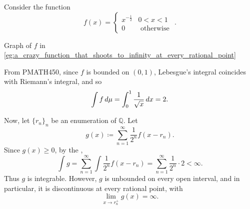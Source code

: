 \documentclass[notoc,notitlepage]{tufte-book}
\begin{document}
\begin{eg}\label{eg:a_crazy_function_that_shoots_to_infinity_at_every_rational_point}
  Consider the function
  \begin{equation*}
    f(x) = \begin{cases}
      x^{- \frac{1}{2}} & 0 < x < 1 \\
      0 & \text{ otherwise }
    \end{cases}.
  \end{equation*}
  \begin{marginfigure}
    \centering
    \caption{Graph of $f$ in \cref{eg:a_crazy_function_that_shoots_to_infinity_at_every_rational_point}}\label{fig:graph_of_eg_a_crazy_function_that_shoots_to_infinity_at_every_rational_point}
  \end{marginfigure}
  From PMATH450, since $f$ is bounded on $(0, 1)$,
  Lebesgue's integral coincides with Riemann's integral, and so
  \begin{equation*}
    \int f \mathop{}\!d{\mu} = \int_0^1 \frac{1}{\sqrt{x}} \mathop{}\!d{x} = 2.
  \end{equation*}

  Now, let $\{ r_n \}_n$ be an enumeration of $\mathbb{Q}$.
  Let
  \begin{equation*}
    g(x) \coloneqq \sum_{n=1}^{\infty} \frac{1}{2^n} f(x - r_n).
  \end{equation*}
  Since $g(x) \geq 0$, by the ,
  \begin{equation*}
    \int g = \sum_{n=1}^{\infty} \int \frac{1}{2^n} f(x - r_n)
        = \sum_{n=1}^{\infty} \frac{1}{2^n} \cdot 2 < \infty.
  \end{equation*}
  Thus $g$ is integrable.
  However, $g$ is unbounded on every open interval,
  and in particular, it is discontinuous at every rational point,
  with
  \begin{equation*}
    \lim_{x \to r_n^+} g(x) = \infty.
  \end{equation*}
\end{eg}
\end{document}
